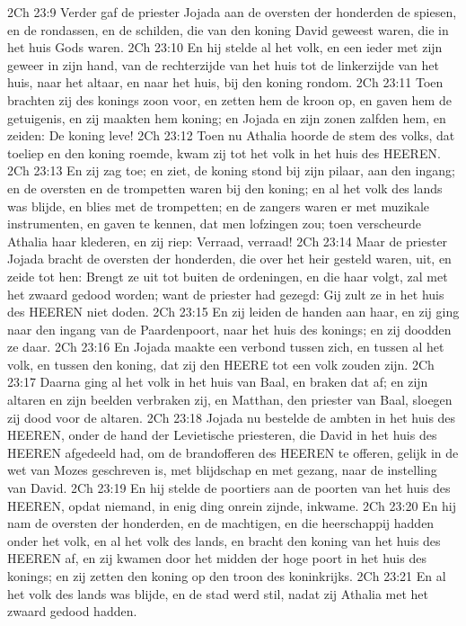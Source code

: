 2Ch 23:9  Verder gaf de priester Jojada aan de oversten der honderden de spiesen, en de rondassen, en de schilden, die van den koning David geweest waren, die in het huis Gods waren.
2Ch 23:10  En hij stelde al het volk, en een ieder met zijn geweer in zijn hand, van de rechterzijde van het huis tot de linkerzijde van het huis, naar het altaar, en naar het huis, bij den koning rondom.
2Ch 23:11  Toen brachten zij des konings zoon voor, en zetten hem de kroon op, en gaven hem de getuigenis, en zij maakten hem koning; en Jojada en zijn zonen zalfden hem, en zeiden: De koning leve!
2Ch 23:12  Toen nu Athalia hoorde de stem des volks, dat toeliep en den koning roemde, kwam zij tot het volk in het huis des HEEREN.
2Ch 23:13  En zij zag toe; en ziet, de koning stond bij zijn pilaar, aan den ingang; en de oversten en de trompetten waren bij den koning; en al het volk des lands was blijde, en blies met de trompetten; en de zangers waren er met muzikale instrumenten, en gaven te kennen, dat men lofzingen zou; toen verscheurde Athalia haar klederen, en zij riep: Verraad, verraad!
2Ch 23:14  Maar de priester Jojada bracht de oversten der honderden, die over het heir gesteld waren, uit, en zeide tot hen: Brengt ze uit tot buiten de ordeningen, en die haar volgt, zal met het zwaard gedood worden; want de priester had gezegd: Gij zult ze in het huis des HEEREN niet doden.
2Ch 23:15  En zij leiden de handen aan haar, en zij ging naar den ingang van de Paardenpoort, naar het huis des konings; en zij doodden ze daar.
2Ch 23:16  En Jojada maakte een verbond tussen zich, en tussen al het volk, en tussen den koning, dat zij den HEERE tot een volk zouden zijn.
2Ch 23:17  Daarna ging al het volk in het huis van Baal, en braken dat af; en zijn altaren en zijn beelden verbraken zij, en Matthan, den priester van Baal, sloegen zij dood voor de altaren.
2Ch 23:18  Jojada nu bestelde de ambten in het huis des HEEREN, onder de hand der Levietische priesteren, die David in het huis des HEEREN afgedeeld had, om de brandofferen des HEEREN te offeren, gelijk in de wet van Mozes geschreven is, met blijdschap en met gezang, naar de instelling van David.
2Ch 23:19  En hij stelde de poortiers aan de poorten van het huis des HEEREN, opdat niemand, in enig ding onrein zijnde, inkwame.
2Ch 23:20  En hij nam de oversten der honderden, en de machtigen, en die heerschappij hadden onder het volk, en al het volk des lands, en bracht den koning van het huis des HEEREN af, en zij kwamen door het midden der hoge poort in het huis des konings; en zij zetten den koning op den troon des koninkrijks.
2Ch 23:21  En al het volk des lands was blijde, en de stad werd stil, nadat zij Athalia met het zwaard gedood hadden.
